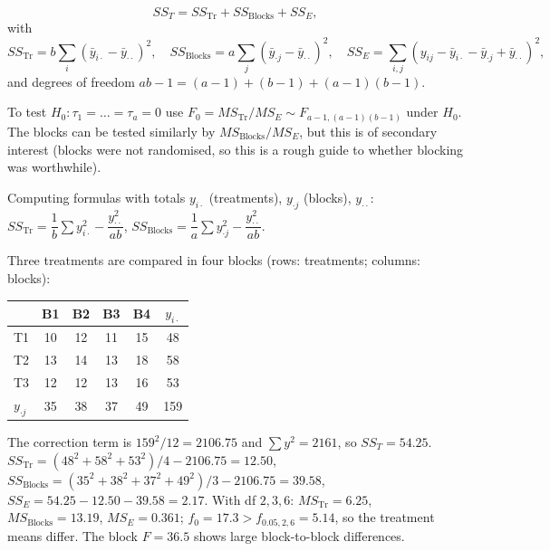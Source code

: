 \begin{theorem}\label{thm:rcbd-ss}
\[ SS_T=SS_{\mathrm{Tr}}+SS_{\mathrm{Blocks}}+SS_E, \]
with
\[ SS_{\mathrm{Tr}}=b\sum_i(\bar{y}_{i\cdot}-\bar{y}_{\cdot\cdot})^2,\quad SS_{\mathrm{Blocks}}=a\sum_j(\bar{y}_{\cdot j}-\bar{y}_{\cdot\cdot})^2,\quad SS_E=\sum_{i,j}(y_{ij}-\bar{y}_{i\cdot}-\bar{y}_{\cdot j}+\bar{y}_{\cdot\cdot})^2, \]
and degrees of freedom $ab-1=(a-1)+(b-1)+(a-1)(b-1)$.
\end{theorem}

\begin{theorem}\label{thm:rcbd-F}
To test $H_0:\tau_1=\dots=\tau_a=0$ use $F_0=MS_{\mathrm{Tr}}/MS_E\sim F_{a-1,(a-1)(b-1)}$ under $H_0$. The blocks can be tested similarly by $MS_{\mathrm{Blocks}}/MS_E$, but this is of secondary interest (blocks were not randomised, so this is a rough guide to whether blocking was worthwhile).
\end{theorem}

Computing formulas with totals $y_{i\cdot}$ (treatments), $y_{\cdot j}$ (blocks), $y_{\cdot\cdot}$: $SS_{\mathrm{Tr}}=\dfrac1b\sum y_{i\cdot}^2-\dfrac{y_{\cdot\cdot}^2}{ab}$, $SS_{\mathrm{Blocks}}=\dfrac1a\sum y_{\cdot j}^2-\dfrac{y_{\cdot\cdot}^2}{ab}$.

\begin{example}\label{ex:rcbd}
Three treatments are compared in four blocks (rows: treatments; columns: blocks):
\begin{center}
\begin{tabular}{l cccc|c}
\toprule
 & B1 & B2 & B3 & B4 & $y_{i\cdot}$\\
\midrule
T1 & 10 & 12 & 11 & 15 & 48\\
T2 & 13 & 14 & 13 & 18 & 58\\
T3 & 12 & 12 & 13 & 16 & 53\\
\midrule
$y_{\cdot j}$ & 35 & 38 & 37 & 49 & 159\\
\bottomrule
\end{tabular}
\end{center}
The correction term is $159^2/12=2106.75$ and $\sum y^2=2161$, so $SS_T=54.25$. $SS_{\mathrm{Tr}}=(48^2+58^2+53^2)/4-2106.75=12.50$, $SS_{\mathrm{Blocks}}=(35^2+38^2+37^2+49^2)/3-2106.75=39.58$, $SS_E=54.25-12.50-39.58=2.17$. With df $2,3,6$: $MS_{\mathrm{Tr}}=6.25$, $MS_{\mathrm{Blocks}}=13.19$, $MS_E=0.361$; $f_0=17.3>f_{0.05,2,6}=5.14$, so the treatment means differ. The block $F=36.5$ shows large block-to-block differences.
\end{example}

